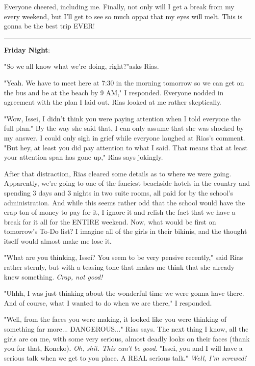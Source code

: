\documentclass{article}
\begin{document}
Everyone cheered, including me. Finally, not only will I get a break from my every weekend, but I'll get to see so much oppai that my eyes will melt. This is gonna be the best trip EVER!

\noindent\rule{\textwidth}{0.4pt}

\textbf{Friday Night}: 

"So we all know what we're doing, right?"asks Rias.

"Yeah. We have to meet here at 7:30 in the morning tomorrow so we can get on the bus and be at the beach by 9 AM," I responded. Everyone nodded in agreement with the plan I laid out. Rias looked at me rather skeptically.

"Wow, Issei, I didn't think you were paying attention when I told everyone the full plan." By the way she said that, I can only assume that she was shocked by my answer. I could only sigh in grief while everyone laughed at Rias's comment. "But hey, at least you did pay attention to what I said. That means that at least your attention span has gone up," Rias says jokingly.

After that distraction, Rias cleared some details as to where we were going. Apparently, we're going to one of the fanciest beachside hotels in the country and spending 3 days and 3 nights in two suite rooms, all paid for by the school's administration. And while this seems rather odd that the school would have the crap ton of money to pay for it, I ignore it and relish the fact that we have a break for it all for the ENTIRE weekend. Now, what would be first on tomorrow's To-Do list? I imagine all of the girls in their bikinis, and the thought itself would almost make me lose it.

"What are you thinking, Issei? You seem to be very pensive recently," said Rias rather sternly, but with a teasing tone that makes me think that she already knew something. \emph{Crap, not good!}

"Uhhh, I was just thinking about the wonderful time we were gonna have there. And of course, what I wanted to do when we are there," I responded.

"Well, from the faces you were making, it looked like you were thinking of something far more... DANGEROUS..." Rias says. The next thing I know, all the girls are on me, with some very serious, almost deadly looks on their faces (thank you for that, Koneko). \emph{Oh, shit. This can't be good}. "Issei, you and I will have a serious talk when we get to you place. A REAL serious talk."  \emph{Well, I'm screwed!}
\end{document}
